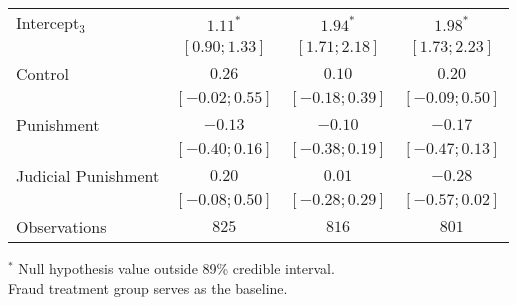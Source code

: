 \begin{table}[h]
\begin{center}
\begin{threeparttable}
\begin{tabular}{l c c c}
Intercept$_3$       & $1.11^{*}$        & $1.94^{*}$        & $1.98^{*}$        \\
                    & $ [ 0.90;  1.33]$ & $ [ 1.71;  2.18]$ & $ [ 1.73;  2.23]$ \\
Control             & $0.26$            & $0.10$            & $0.20$            \\
                    & $ [-0.02;  0.55]$ & $ [-0.18;  0.39]$ & $ [-0.09;  0.50]$ \\
Punishment          & $-0.13$           & $-0.10$           & $-0.17$           \\
                    & $ [-0.40;  0.16]$ & $ [-0.38;  0.19]$ & $ [-0.47;  0.13]$ \\
Judicial Punishment & $0.20$            & $0.01$            & $-0.28$           \\
                    & $ [-0.08;  0.50]$ & $ [-0.28;  0.29]$ & $ [-0.57;  0.02]$ \\
\hline
Observations        & $825$             & $816$             & $801$             \\
\hline
\end{tabular}
\begin{tablenotes}[flushleft]
\scriptsize{$^*$ Null hypothesis value outside 89\% credible interval.  \\
Fraud treatment group serves as the baseline.}
\end{tablenotes}
\end{threeparttable}
\label{table:coefficients}
\end{center}
\end{table}
